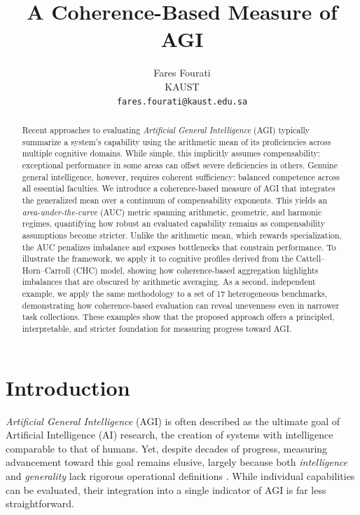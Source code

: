 \documentclass{article}
\title{A Coherence-Based Measure of AGI}
\author{%
  Fares Fourati \\%
  KAUST\\
  \texttt{fares.fourati@kaust.edu.sa} \\
}
\begin{document}
\maketitle


\begin{abstract}
Recent approaches to evaluating \textit{Artificial General Intelligence} (AGI) typically summarize a system’s capability using the arithmetic mean of its proficiencies across multiple cognitive domains. While simple, this implicitly assumes compensability: exceptional performance in some areas can offset severe deficiencies in others. Genuine general intelligence, however, requires coherent sufficiency: balanced competence across all essential faculties.
We introduce a coherence-based measure of AGI that integrates the generalized mean over a continuum of compensability exponents. This yields an \textit{area-under-the-curve} (AUC) metric spanning arithmetic, geometric, and harmonic regimes, quantifying how robust an evaluated capability remains as compensability assumptions become stricter. Unlike the arithmetic mean, which rewards specialization, the AUC penalizes imbalance and exposes bottlenecks that constrain performance.
To illustrate the framework, we apply it to cognitive profiles derived from the Cattell–Horn–Carroll (CHC) model, showing how coherence-based aggregation highlights imbalances that are obscured by arithmetic averaging. As a second, independent example, we apply the same methodology to a set of 17 heterogeneous benchmarks, demonstrating how coherence-based evaluation can reveal unevenness even in narrower task collections. These examples show that the proposed approach offers a principled, interpretable, and stricter foundation for measuring progress toward AGI.
\end{abstract}





\section{Introduction}

\textit{Artificial General Intelligence} (AGI) is often described as the ultimate goal of Artificial Intelligence (AI) research, the creation of systems with intelligence comparable to that of humans. Yet, despite decades of progress, measuring advancement toward this goal remains elusive, largely because both \textit{intelligence} and \textit{generality} lack rigorous operational definitions \citep{chollet2019measure}. While individual capabilities can be evaluated, their integration into a single indicator of AGI is far less straightforward.
\end{document}

